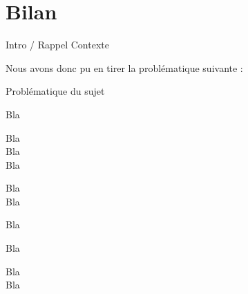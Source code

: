 \chapter{Bilan}

Intro / Rappel Contexte

Nous avons donc pu en tirer la problématique suivante :

\begin{center}
\hskip7mm
Problématique du sujet
\end{center}

Bla

Bla\\

Bla\\

Bla

Bla\\

Bla

Bla

\newpage

Bla

Bla\\

Bla